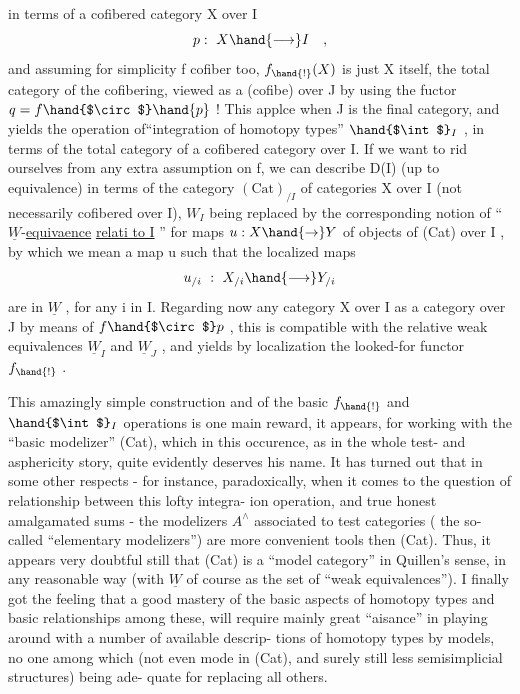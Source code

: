 
in terms of a cofibered category X over I
\[ p:\ X \hand{\longrightarrow} I \quad , \]
and assuming for simplicity f cofiber too, $f_{\hand{!}}(X)$ is just X itself,
the total category of the cofibering, viewed as a (cofibe) 
over J by using the fuctor $q = f\hand{$\circ$}\hand{p}$ ! This applce when J
is the final category, and yields the operation of``integration of
homotopy types'' $\hand{$\int$}_I$ , in terms of the total category of a  cofibered
category over I. If we want to rid ourselves from any extra assumption
on f, we can describe D(I) (up to equivalence) in terms of the category
$(\mathrm{Cat})_{/I}$ of categories X over I (not necessarily cofibered over I), $W_I$
being replaced by the corresponding notion of ``$\underline{W}$-\uline{equivaence}  \uline{relati
to I} '' for maps $u : X \hand{\to} Y$ of objects of (Cat) over I , by which we mean
a map u such that the localized maps
\[ u_{/i} \ :\ X_{/i} \hand{\longrightarrow} Y_{/i} \]
are in $\underline{W}$ , for any i in I. Regarding now any category X over I as a
category over J by means of $f\hand{$\circ$}p$ , this is  compatible with the relative
weak equivalences $\underline{W}_I$ and $\underline{W}_J$ , and yields by localization the looked-for
functor $f_{\hand{!}}$ .

This amazingly simple construction and  of the basic
$f_{\hand{!}}$ and $\hand{$\int$}_I$ operations is one main reward, it appears, for working with
the ``basic modelizer'' (Cat), which in this occurence, as in the whole
test- and asphericity story, quite evidently deserves his name. It has
turned out  that in some other respects - for instance, paradoxically,
when it comes to the question of relationship between this lofty integra-%
ion operation, and true honest amalgamated sums - the modelizers $A^{\wedge}$
associated to test categories  ( the so-called ``elementary modelizers'') are
more convenient tools then (Cat). Thus, it appears very doubtful still
that (Cat) is a ``model category'' in Quillen's sense, in any reasonable
way (with $\underline{W}$ of course as the set of ``weak equivalences''). I finally got
the feeling that  a good mastery of the basic aspects of homotopy types
and   basic relationships among these, will require mainly
great ``aisance'' in playing  around with a number of available descrip-%
tions of homotopy types by models, no one among which (not even  mode
in (Cat), and surely  still less  semisimplicial structures) being ade-%
quate for replacing all others.

